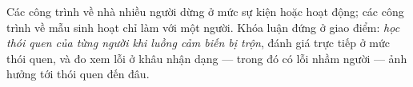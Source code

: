 Các công trình về nhà nhiều người dừng ở mức sự kiện hoặc hoạt động; các công trình về mẫu sinh hoạt
chỉ làm với một người. Khóa luận đứng ở giao điểm: \emph{học thói quen của từng người khi luồng cảm
biến bị trộn}, đánh giá trực tiếp ở mức thói quen, và đo xem lỗi ở khâu nhận dạng --- trong đó có
lỗi nhầm người --- ảnh hưởng tới thói quen đến đâu.

